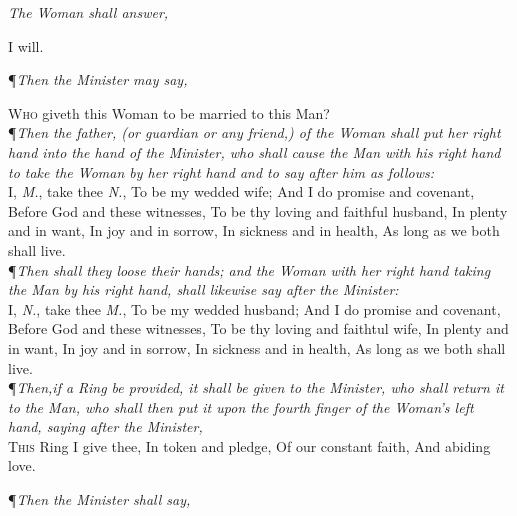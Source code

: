 {\centering\textit{The Woman shall answer,}\par}
\vspace{1ex}

{\centering I will. \par}
\vspace{1ex}

{\centering\P\textit{Then the Minister may say,}\par}
\vspace{1ex}

\lettrine[lines=1]{W}{ho} giveth this Woman to be married to this Man? \\

\noindent\P\textit{Then the father, (or guardian or any friend,) of the Woman
shall put her right hand into the hand of the Minister, who
shall cause the Man with his right hand to take the Woman by
her right hand and to say after him as follows:} \\

\lettrine{I}{,} \textit{M.}, take thee \textit{N.}, To be my wedded wife; And I do
promise and covenant, Before God and these witnesses,
To be thy loving and faithful husband, In plenty and in
want, In joy and in sorrow, In sickness and in health, As
long as we both shall live. \\

\noindent\P\textit{Then shall they loose their hands; and the Woman with her
right hand taking the Man by his right hand, shall likewise say
after the Minister:} \\

\lettrine{I}{,} \textit{N.}, take thee \textit{M.}, To be my wedded husband; And I do
promise and covenant, Before God and these witnesses,
To be thy loving and faithtul wife, In plenty and in want,
In joy and in sorrow, In sickness and in health, As long as
we both shall live. \\

\noindent\P\textit{Then,if a Ring be provided, it shall be given to the Minister, who
shall return it to the Man, who shall then put it upon the fourth
finger of the Woman’s left hand, saying after the Minister,} \\

\lettrine{T}{his} Ring I give thee, In token and pledge, Of our constant faith, And abiding love. \\

{\centering\P\textit{Then the Minister shall say,}\par}
\vspace{1ex}

